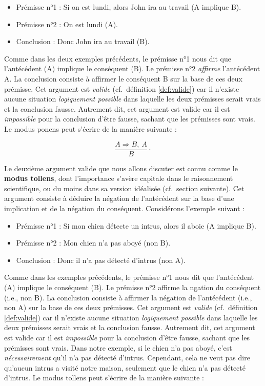 \documentclass[
  a4paper,11pt,twoside,onecolumn,openright,final,oldfontcommands]{memoir}
\providecommand{\tightlist}{%
  \setlength{\itemsep}{0pt}\setlength{\parskip}{0pt}}
\theoremstyle{definition}
\theoremstyle{definition}
\theoremstyle{definition}
\theoremstyle{remark}
\begin{document}
\begin{itemize}
\tightlist
\item
  Prémisse n°1 : Si on est lundi, alors John ira au travail (A implique B).
\item
  Prémisse n°2 : On est lundi (A).
\item
  Conclusion : Donc John ira au travail (B).
\end{itemize}

Comme dans les deux exemples précédents, le prémisse n°1 nous dit que l'antécédent (A) implique le conséquent (B). Le prémisse n°2 \emph{affirme} l'antécédent A. La conclusion consiste à affirmer le conséquent B sur la base de ces deux prémisse. Cet argument est \emph{valide} (cf.~définition \ref{def:valide}) car il n'existe aucune situation \emph{logiquement possible} dans laquelle les deux prémisses serait vrais et la conclusion fausse. Autrement dit, cet argument est valide car il est \emph{impossible} pour la conclusion d'être fausse, sachant que les prémisses sont vrais. Le modus ponens peut s'écrire de la manière suivante :

\[\dfrac{A \Rightarrow B, \ A}{B} \cdot\]

Le deuxième argument valide que nous allons discuter est connu comme le \textbf{modus tollens}, dont l'importance s'avère capitale dans le raisonnement scientifique, ou du moins dans sa version idéalisée (cf.~section suivante). Cet argument consiste à déduire la négation de l'antécédent sur la base d'une implication et de la négation du conséquent. Considérons l'exemple suivant :

\begin{itemize}
\tightlist
\item
  Prémisse n°1 : Si mon chien détecte un intrus, alors il aboie (A implique B).
\item
  Prémisse n°2 : Mon chien n'a pas aboyé (non B).
\item
  Conclusion : Donc il n'a pas détecté d'intrus (non A).
\end{itemize}

Comme dans les exemples précédents, le prémisse n°1 nous dit que l'antécédent (A) implique le conséquent (B). Le prémisse n°2 affirme la ngation du conséquent (i.e., non B). La conclusion consiste à affirmer la négation de l'antécédent (i.e., non A) sur la base de ces deux prémisses. Cet argument est \emph{valide} (cf.~définition \ref{def:valide}) car il n'existe aucune situation \emph{logiquement possible} dans laquelle les deux prémisses serait vrais et la conclusion fausse. Autrement dit, cet argument est valide car il est \emph{impossible} pour la conclusion d'être fausse, sachant que les prémisses sont vrais. Dans notre exemple, si le chien n'a pas aboyé, c'est \emph{nécessairement} qu'il n'a pas détecté d'intrus. Cependant, cela ne veut pas dire qu'aucun intrus a visité notre maison, seulement que le chien n'a pas détecté d'intrus. Le modus tollens peut s'écrire de la manière suivante :
\end{document}
